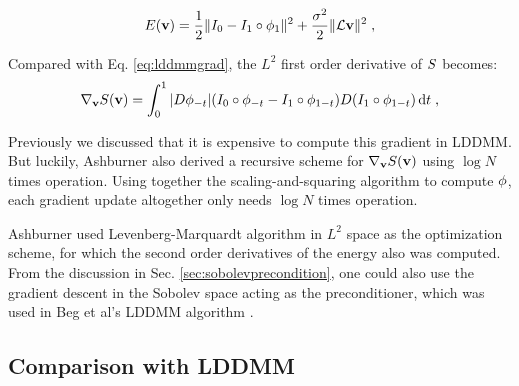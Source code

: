 \documentclass[letterpaper,12pt]{article}
\begin{document}
\begin{align}
E(\mathbf{v}) = \frac{1}{2} \| I_0 - I_1 \circ \phi_{1} \|^2 
+ 
\frac{\sigma^2}{2} \| \mathcal{L} \mathbf{v}\|^2  \;,
\label{eq:dartel}
\end{align}

Compared with Eq. \ref{eq:lddmmgrad}, the $L^2$ first order derivative of $S$ becomes:
\begin{align}
\nabla_{\mathbf{v}} S(\mathbf{v}) = \int_{0}^{1} 
|D\phi_{-t}|
(I_0 \circ \phi_{-t} - I_1 \circ \phi_{1-t})
D(I_1 \circ \phi_{1-t})
\, \text{d} t \; ,
\label{eq:dartelds}
\end{align}

Previously we discussed that it is expensive to compute this gradient in LDDMM. But luckily, Ashburner \cite{Ashburner2007} also derived a recursive scheme for $\nabla_{\mathbf{v}} S(\mathbf{v})$ using $\log N$ times operation. Using together the scaling-and-squaring algorithm to compute $\phi$, each gradient update altogether only needs $\log N$ times operation. 

Ashburner used Levenberg-Marquardt algorithm in $L^2$ space as the optimization scheme, for which the second order derivatives of the energy also was computed. From the discussion in Sec. \ref{sec:sobolevprecondition}, one could also use the gradient descent in the Sobolev space acting as the preconditioner, which was used in Beg et al's LDDMM algorithm \cite{Beg2005Computing}. 

\subsection{Comparison with LDDMM}
\end{document}
